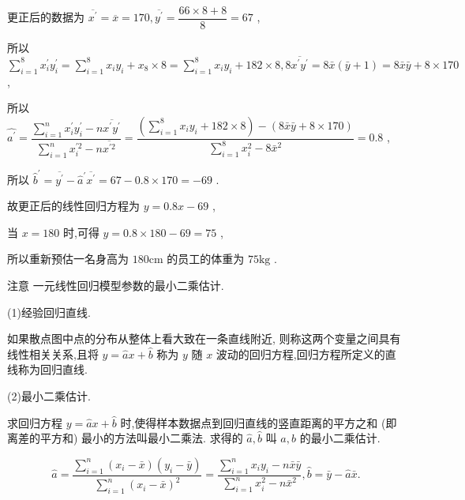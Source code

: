 更正后的数据为 $\overline{{x}^{\prime }} = \overline{x} = {170},\overline{{y}^{\prime }} = \dfrac{{66} \times  8 + 8}{8} = {67}$ ,

所以 $\mathop{\sum }\limits_{{i = 1}}^{8}{x}_{i}^{\prime }{y}_{i}^{\prime } = \mathop{\sum }\limits_{{i = 1}}^{8}{x}_{i}{y}_{i} + {x}_{8} \times  8 = \mathop{\sum }\limits_{{i = 1}}^{8}{x}_{i}{y}_{i} + {182} \times  8,8\overline{{x}^{\prime }{y}^{\prime }} = 8\bar{x}\left( {\bar{y} + 1}\right)  = 8\bar{x}\bar{y} + 8 \times  {170}$ ,

所以 $\widehat{{a}^{\prime }} = \dfrac{\mathop{\sum }\limits_{{i = 1}}^{n}{x}_{i}^{\prime }{y}_{i}^{\prime } - n\overline{{x}^{\prime }{y}^{\prime }}}{\mathop{\sum }\limits_{{i = 1}}^{n}{x}_{i}^{\prime 2} - n\overline{{x}^{\prime 2}}} = \dfrac{\left( {\mathop{\sum }\limits_{{i = 1}}^{8}{x}_{i}{y}_{i} + {182} \times  8}\right)  - \left( {8\bar{x}\bar{y} + 8 \times  {170}}\right) }{\mathop{\sum }\limits_{{i = 1}}^{8}{x}_{i}^{2} - 8{\bar{x}}^{2}} = {0.8}$ ,

所以 ${\widehat{b}}^{\prime } = \overline{{y}^{\prime }} - {\widehat{a}}^{\prime }\overline{{x}^{\prime }} = {67} - {0.8} \times  {170} =  - {69}$ .

故更正后的线性回归方程为 $y = {0.8x} - {69}$ ,

当 $x = {180}$ 时,可得 $y = {0.8} \times  {180} - {69} = {75}$ ,

所以重新预估一名身高为 ${180}\mathrm{{cm}}$ 的员工的体重为 ${75}\mathrm{{kg}}$ .

注意 一元线性回归模型参数的最小二乘估计.

(1)经验回归直线.

如果散点图中点的分布从整体上看大致在一条直线附近, 则称这两个变量之间具有线性相关关系,且将 $y = \widehat{a}x + \widehat{b}$ 称为 $y$ 随 $x$ 波动的回归方程,回归方程所定义的直线称为回归直线.

(2)最小二乘估计.

求回归方程 $y = \widehat{a}x + \widehat{b}$ 时,使得样本数据点到回归直线的竖直距离的平方之和 (即离差的平方和) 最小的方法叫最小二乘法. 求得的 $\widehat{a},\widehat{b}$ 叫 $a,b$ 的最小二乘估计.

\[
\widehat{a} = \dfrac{\mathop{\sum }\limits_{{i = 1}}^{n}\left( {{x}_{i} - \bar{x}}\right) \left( {{y}_{i} - \bar{y}}\right) }{\mathop{\sum }\limits_{{i = 1}}^{n}{\left( {x}_{i} - \bar{x}\right) }^{2}} = \dfrac{\mathop{\sum }\limits_{{i = 1}}^{n}{x}_{i}{y}_{i} - n\bar{x}\bar{y}}{\mathop{\sum }\limits_{{i = 1}}^{n}{x}_{i}^{2} - n{\bar{x}}^{2}},\widehat{b} = \bar{y} - \widehat{a}\bar{x}.
\]

